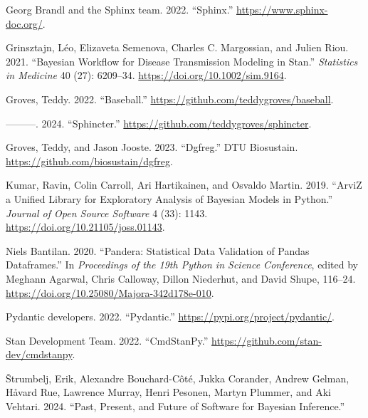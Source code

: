 \documentclass[
  letterpaper,
  DIV=11,
  numbers=noendperiod]{scrartcl}
\newlength{\cslhangindent}
\newenvironment{CSLReferences}[2] %
 {\begin{list}{}{%
  \setlength{\itemindent}{0pt}
  \setlength{\leftmargin}{0pt}
  \setlength{\parsep}{0pt}
  \ifodd #1
   \setlength{\leftmargin}{\cslhangindent}
   \setlength{\itemindent}{-1\cslhangindent}
  \fi
  \setlength{\itemsep}{#2\baselineskip}}}
 {\end{list}}
\begin{document}
\begin{CSLReferences}{1}{0}
Georg Brandl and the Sphinx team. 2022. {``Sphinx.''}
\url{https://www.sphinx-doc.org/}.

Grinsztajn, Léo, Elizaveta Semenova, Charles C. Margossian, and Julien
Riou. 2021. {``Bayesian Workflow for Disease Transmission Modeling in
{Stan}.''} \emph{Statistics in Medicine} 40 (27): 6209--34.
\url{https://doi.org/10.1002/sim.9164}.

Groves, Teddy. 2022. {``Baseball.''}
\url{https://github.com/teddygroves/baseball}.

---------. 2024. {``Sphincter.''}
\url{https://github.com/teddygroves/sphincter}.

Groves, Teddy, and Jason Jooste. 2023. {``Dgfreg.''} DTU Biosustain.
\url{https://github.com/biosustain/dgfreg}.

Kumar, Ravin, Colin Carroll, Ari Hartikainen, and Osvaldo Martin. 2019.
{``{ArviZ} a Unified Library for Exploratory Analysis of {Bayesian}
Models in {Python}.''} \emph{Journal of Open Source Software} 4 (33):
1143. \url{https://doi.org/10.21105/joss.01143}.

Niels Bantilan. 2020. {``Pandera: {Statistical Data Validation} of
{Pandas Dataframes}.''} In \emph{Proceedings of the 19th {Python} in
{Science Conference}}, edited by Meghann Agarwal, Chris Calloway, Dillon
Niederhut, and David Shupe, 116--24.
\url{https://doi.org/10.25080/Majora-342d178e-010}.

Pydantic developers. 2022. {``Pydantic.''}
\url{https://pypi.org/project/pydantic/}.

Stan Development Team. 2022. {``{CmdStanPy}.''}
\url{https://github.com/stan-dev/cmdstanpy}.

Štrumbelj, Erik, Alexandre Bouchard-Côté, Jukka Corander, Andrew Gelman,
Håvard Rue, Lawrence Murray, Henri Pesonen, Martyn Plummer, and Aki
Vehtari. 2024. {``Past, {Present}, and {Future} of {Software} for
{Bayesian Inference}.''}

\end{CSLReferences}
\end{document}
